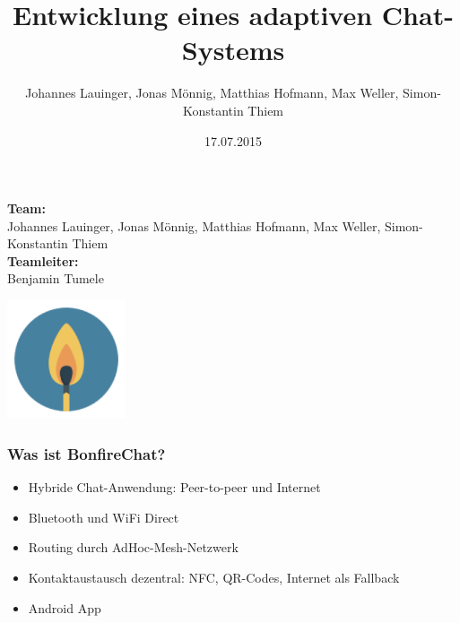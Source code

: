 \documentclass[accentcolor=tud2d,colorbacktitle]{tudbeamer}
\title{Entwicklung eines adaptiven Chat-Systems}
\author{Johannes Lauinger, Jonas Mönnig, Matthias Hofmann, Max Weller, Simon-Konstantin Thiem}
\date{17.07.2015}
\begin{document}
  \begin{titleframe}
    \textbf{Team:}\\
    Johannes Lauinger, Jonas Mönnig, Matthias Hofmann, Max Weller, Simon-Konstantin Thiem\\
    \vspace{0.5cm}
    \textbf{Teamleiter:}\\
    Benjamin Tumele
    \begin{flushright}
      \includegraphics[height=3.5cm]{icon.png}
    \end{flushright}
  \end{titleframe}

  \begin{frame}
    \frametitle{Was ist BonfireChat?}
    \begin{itemize}
      \item Hybride Chat-Anwendung: Peer-to-peer und Internet
      \item Bluetooth und WiFi Direct
      \item Routing durch AdHoc-Mesh-Netzwerk
      \item Kontaktaustausch dezentral: NFC, QR-Codes, Internet als Fallback
      \item Android App
    \end{itemize}
  \end{frame}
\end{document}

